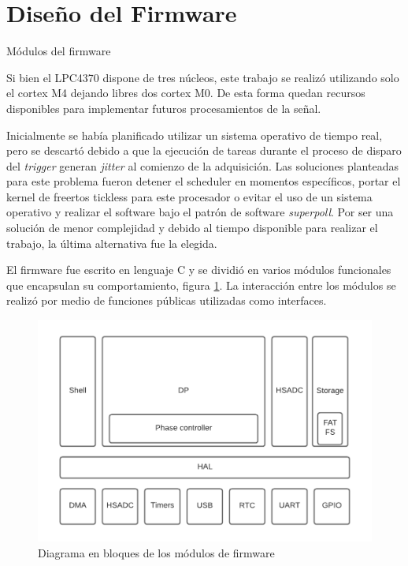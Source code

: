 \section{Diseño del Firmware}

Módulos del firmware

Si bien el LPC4370 dispone de tres núcleos, este trabajo se realizó utilizando solo el cortex M4 dejando libres dos cortex M0. De esta forma quedan recursos disponibles para implementar futuros procesamientos de la señal. 

Inicialmente se había planificado utilizar un sistema operativo de tiempo real, pero se descartó debido a que la ejecución de tareas durante el proceso de disparo del \textit{trigger} generan \textit{jitter} al comienzo de la adquisición. Las soluciones planteadas para este problema fueron detener el scheduler en momentos específicos, portar el kernel de freertos tickless para este procesador o evitar el uso de un sistema operativo y realizar el software bajo el patrón de software \textit{superpoll}. Por ser una solución de menor complejidad y debido al tiempo disponible para realizar el trabajo, la última alternativa fue la elegida.

El firmware fue escrito en lenguaje C y se dividió en varios módulos funcionales que encapsulan su comportamiento, figura \ref{fig:firmBloques}. La interacción entre los módulos se realizó por medio de funciones públicas utilizadas como interfaces. 

\begin{figure}[ht]
	\centering
	\includegraphics[width=130mm]{./Figures/firmBloques.png}
	\caption{Diagrama en bloques de los módulos de firmware}
	\label{fig:firmBloques}
\end{figure}

